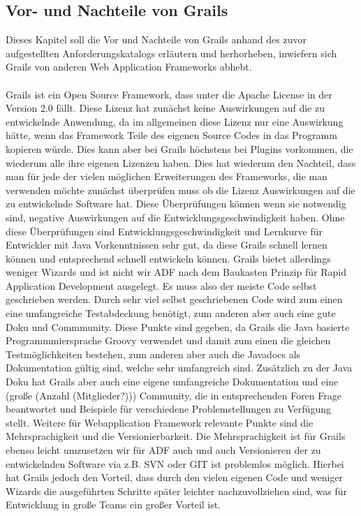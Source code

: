 \subsection{Vor- und Nachteile von Grails}
Dieses Kapitel soll die Vor und Nachteile von Grails anhand des zuvor aufgestellten Anforderungskatalogs erläutern und herhorheben, inwiefern sich Grails von anderen Web Application Frameworks abhebt.\\\\
Grails ist ein Open Source Framework, dass unter die Apache License in der Version 2.0 fällt. Diese Lizenz hat zunächst keine Auswirkungen auf die zu entwickelnde Anwendung, da im allgemeinen diese Lizenz nur eine Auswirkung hätte, wenn das Framework Teile des eigenen Source Codes in das Programm kopieren würde. Dies kann aber bei Grails höchstens bei Plugins vorkommen, die wiederum alle ihre eigenen Lizenzen haben. Dies hat wiederum den Nachteil, dass man für jede der vielen möglichen Erweiterungen des Frameworks, die man verwenden möchte zunächst überprüfen muss ob die Lizenz Auswirkungen auf die zu entwickelnde Software hat. Diese Überprüfungen können wenn sie notwendig sind, negative Auswirkungen auf die Entwicklungsgeschwindigkeit haben. Ohne diese Überprüfungen sind Entwicklungsgeschwindigkeit und Lernkurve für Entwickler mit Java Vorkenntnissen sehr gut, da diese Grails schnell lernen können und entsprechend schnell entwickeln können. Grails bietet allerdings weniger Wizards und ist nicht wir ADF nach dem Baukasten Prinzip für Rapid Application Development ausgelegt. Es muss also der meiste Code selbst geschrieben werden. Durch sehr viel selbst geschriebenen Code wird zum einen eine umfangreiche Testabdeckung benötigt, zum anderen aber auch eine gute Doku und Commmunity. Diese Punkte sind gegeben, da Grails die Java basierte Programmmiersprache Groovy verwendet und damit zum einen die gleichen Testmöglichkeiten bestehen, zum anderen aber auch die Javadocs als Dokumentation gültig sind, welche sehr umfangreich sind. Zusätzlich zu der Java Doku hat Grails aber auch eine eigene umfangreiche Dokumentation und eine (große (Anzahl (Mitglieder?))) Community, die in entsprechenden Foren Frage beantwortet und Beispiele für verschiedene Problemstellungen zu Verfügung stellt. Weitere für Webapplication Framework relevante Punkte sind die Mehrsprachigkeit und die Versionierbarkeit. Die Mehrsprachigkeit ist für Grails ebenso leicht umzusetzen wir für ADF auch und auch Versionieren der zu entwickelnden Software via z.B. SVN oder GIT ist problemlos möglich. Hierbei hat Grails jedoch den Vorteil, dass durch den vielen eigenen Code und weniger Wizards die ausgeführten Schritte später leichter nachzuvollziehen sind, was für Entwicklung in große Teams ein großer Vorteil ist.